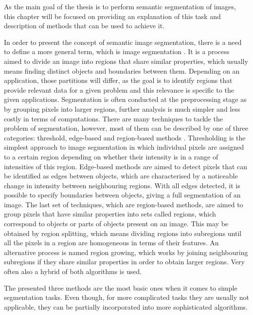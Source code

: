 As the main goal of the thesis is to perform semantic segmentation of images, this chapter will be focused on providing an explanation of this task and description of methods that can be used to achieve it. 

In order to present the concept of semantic image segmentation, there is a need to define a more general term, which is image segmentation \cite{digital_image_processing}. It is a process aimed to divide an image into regions that share similar properties, which usually means finding distinct objects and boundaries between them. Depending on an application, those partitions will differ, as the goal is to identify regions that provide relevant data for a given problem and this relevance is specific to the given applications. Segmentation is often conducted at the preprocessing stage as by grouping pixels into larger regions, further analysis is much simpler and less costly in terms of computations. 
There are many techniques to tackle the problem of segmentation, however, most of them can be described by one of three categories: threshold, edge-based and region-based methods \cite{Glasbey_segmentation}. Thresholding is the simplest approach to image segmentation in which individual pixels are assigned to a certain region depending on whether their intensity is in a range of intensities of this region. Edge-based methods are aimed to detect pixels that can be identified as edges between objects, which are characterised by a noticeable change in intensity between neighbouring regions. With all edges detected, it is possible to specify boundaries between objects, giving a full segmentation of an image. The last set of techniques, which are region-based methods, are aimed to group pixels that have similar properties into sets called regions, which correspond to objects or parts of objects present on an image. This may be obtained by region splitting, which means dividing regions into subregions until all the pixels in a region are homogeneous in terms of their features. An alternative process is named region growing, which works by joining neighbouring subregions if they share similar properties in order to obtain larger regions. Very often also a hybrid of both algorithms is used. 

The presented three methods are the most basic ones when it comes to simple segmentation tasks. Even though, for more complicated tasks they are usually not applicable, they can be partially  incorporated into more sophisticated algorithms. 
